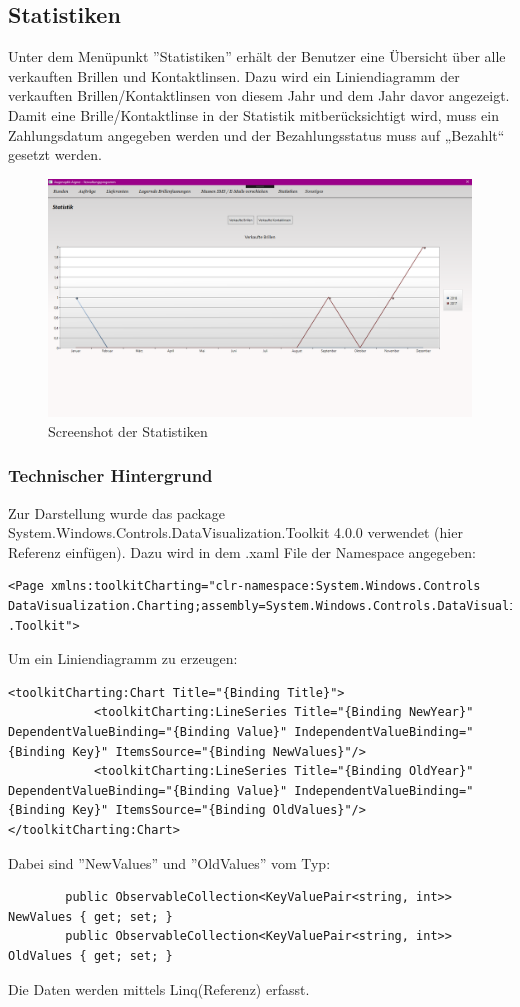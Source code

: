 \subsection{Statistiken}
Unter dem Menüpunkt ''Statistiken'' erhält der Benutzer eine Übersicht über alle verkauften Brillen und Kontaktlinsen. Dazu wird ein Liniendiagramm der verkauften Brillen/Kontaktlinsen von diesem Jahr und dem Jahr davor angezeigt. Damit eine Brille/Kontaktlinse in der Statistik mitberücksichtigt wird, muss ein Zahlungsdatum angegeben werden und der Bezahlungsstatus muss auf „Bezahlt“ gesetzt werden.
\begin{figure}[ht]
\begin{center}
	\includegraphics[scale=.25]{images/Statistiken.png}
\end{center}
	\caption{Screenshot der Statistiken}
	\label{fig:sample}
\end{figure}
\subsubsection{Technischer Hintergrund}
Zur Darstellung wurde das package System.Windows.Controls.DataVisualization.Toolkit 4.0.0 verwendet (hier Referenz einfügen). 
Dazu wird in dem .xaml File der Namespace angegeben: 
\begin{lstlisting}
<Page xmlns:toolkitCharting="clr-namespace:System.Windows.Controls
DataVisualization.Charting;assembly=System.Windows.Controls.DataVisualization
.Toolkit">
\end{lstlisting}
Um ein Liniendiagramm zu erzeugen:
\begin{lstlisting}
<toolkitCharting:Chart Title="{Binding Title}">
            <toolkitCharting:LineSeries Title="{Binding NewYear}"  DependentValueBinding="{Binding Value}" IndependentValueBinding="{Binding Key}" ItemsSource="{Binding NewValues}"/>
            <toolkitCharting:LineSeries Title="{Binding OldYear}"  DependentValueBinding="{Binding Value}" IndependentValueBinding="{Binding Key}" ItemsSource="{Binding OldValues}"/>
</toolkitCharting:Chart>
\end{lstlisting}
Dabei sind ''NewValues'' und ''OldValues'' vom Typ: 
\begin{lstlisting}
        public ObservableCollection<KeyValuePair<string, int>> NewValues { get; set; }
        public ObservableCollection<KeyValuePair<string, int>> OldValues { get; set; }
\end{lstlisting}
Die Daten werden mittels Linq(Referenz) erfasst.